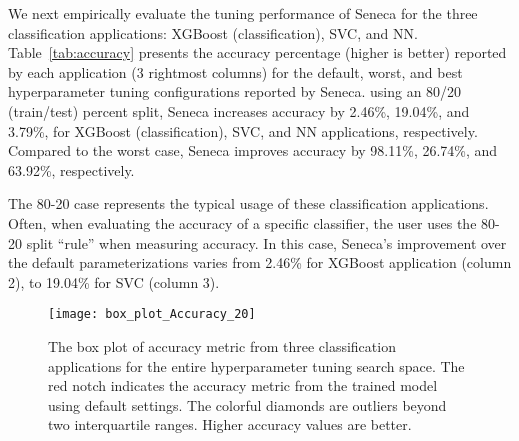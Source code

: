 We next empirically evaluate the tuning performance of Seneca for the three
classification applications: XGBoost (classification), SVC, and NN.
Table~\ref{tab:accuracy} presents the accuracy percentage (higher is
better) reported by each application (3 rightmost columns) for the default,
worst, and best hyperparameter tuning configurations reported by Seneca.
using an 80/20 (train/test) percent split,
Seneca increases accuracy by 2.46\%, 19.04\%, and 3.79\%, for XGBoost
(classification), SVC, and NN applications, respectively.  Compared to
the worst case, Seneca improves accuracy by 98.11\%, 26.74\%, and 63.92\%,
respectively.


\begin{table}
\centering

\caption{The Accuracy reported for the 
default, best (Seneca's recommendation), and worst hyperparameter configurations for 
the three classification applications using 80\% of the data to train and 20\%
of the data as a test set. 
For the accuracy values in the table, higher is better.
\label{tab:accuracy}}
\vspace{-0.2in}
\end{table}


The 80-20 case represents the typical usage of these classification
applications. Often, when evaluating the accuracy of a specific classifier,
the user uses the 80-20 split ``rule'' when measuring accuracy. In this case,
Seneca's improvement over the default parameterizations varies from 2.46\% for XGBoost application (column 2), to 19.04\% for SVC
(column 3).

\begin{figure}[t] \centering 
\texttt{[image: box\_plot\_Accuracy\_20]}
\vspace{-0.4in}
\caption{The box plot of accuracy metric from three classification applications for the entire hyperparameter tuning search space. The red notch indicates the accuracy metric from the trained model using default settings. The colorful diamonds are outliers beyond two interquartile ranges. Higher accuracy values are better.
\label{fig:box_plot_accuracy}}
\vspace{-0.1in}
\end{figure}

